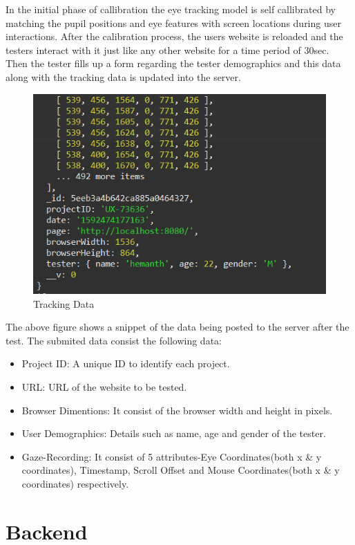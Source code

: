 \documentclass[12pt,a4paper,final]{extreport}
\begin{document}
In the initial phase of callibration the eye tracking model is self callibrated by matching the pupil positions and eye features with screen locations during user interactions.
After the calibration process, the users website is reloaded and the testers interact with it just like any other website for a time period of 30sec. Then the tester fills up a form regarding the tester demographics and this data along with the tracking data is updated into the server.
\begin{figure}[H]
    \centering
    \includegraphics[width=\linewidth]{tracking-data.png}
    \caption{Tracking Data}
\end{figure}

The above figure shows a snippet of the data being posted to the server after the test.
The submited data consist the following data:
\begin{itemize}
	\item Project ID: A unique ID to identify each project.
	\item URL: URL of the website to be tested.
	\item Browser Dimentions: It consist of the browser width and height in pixels.
	\item User Demographics: Details such as name, age and gender of the tester.
	\item Gaze-Recording: It consist of 5 attributes-Eye Coordinates(both x \& y coordinates), Timestamp, Scroll Offset and Mouse Coordinates(both x \& y coordinates) respectively.
\end{itemize}

\section{Backend}
\end{document}
